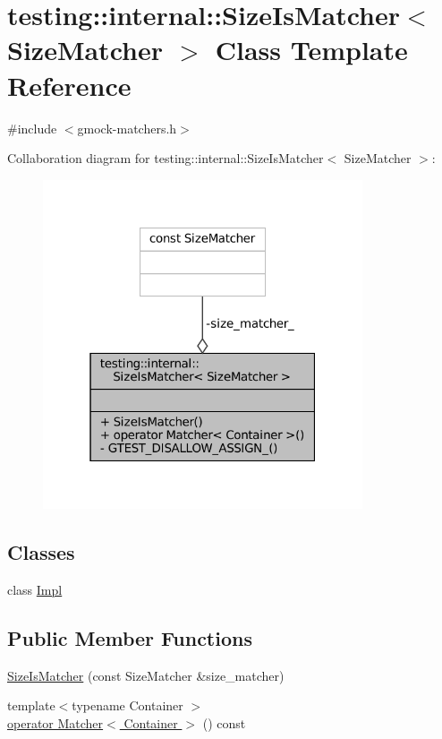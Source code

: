 \hypertarget{classtesting_1_1internal_1_1SizeIsMatcher}{}\section{testing\+:\+:internal\+:\+:Size\+Is\+Matcher$<$ Size\+Matcher $>$ Class Template Reference}
\label{classtesting_1_1internal_1_1SizeIsMatcher}


{\ttfamily \#include $<$gmock-\/matchers.\+h$>$}



Collaboration diagram for testing\+:\+:internal\+:\+:Size\+Is\+Matcher$<$ Size\+Matcher $>$\+:
\nopagebreak
\begin{figure}[H]
\begin{center}
\leavevmode
\includegraphics[width=268pt]{classtesting_1_1internal_1_1SizeIsMatcher__coll__graph}
\end{center}
\end{figure}
\subsection*{Classes}
\begin{DoxyCompactItemize}
\item 
class \hyperlink{classtesting_1_1internal_1_1SizeIsMatcher_1_1Impl}{Impl}
\end{DoxyCompactItemize}
\subsection*{Public Member Functions}
\begin{DoxyCompactItemize}
\item 
\hyperlink{classtesting_1_1internal_1_1SizeIsMatcher_ab6a4e770fe9c1f6d07ef8bf0bc996d5d}{Size\+Is\+Matcher} (const Size\+Matcher \&size\+\_\+matcher)
\item 
{\footnotesize template$<$typename Container $>$ }\\\hyperlink{classtesting_1_1internal_1_1SizeIsMatcher_abeb0ee5ead7c7a3066dab0d4efe793ea}{operator Matcher$<$ Container $>$} () const
\end{DoxyCompactItemize}

